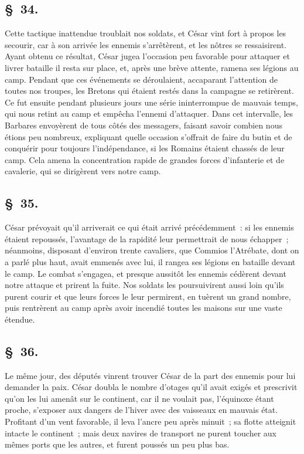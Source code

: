 \documentclass[french,twoside]{book} %
\begin{document}
\subsection[{§ 34.}]{ \textsc{§ 34.} }
\noindent Cette tactique inattendue troublait nos soldats, et César vint fort à propos les secourir, car à son arrivée les ennemis s’arrêtèrent, et les nôtres se ressaisirent. Ayant obtenu ce résultat, César jugea l’occasion peu favorable pour attaquer et livrer bataille il resta sur place, et, après une brève attente, ramena ses légions au camp. Pendant que ces événements se déroulaient, accaparant l’attention de toutes nos troupes, les Bretons qui étaient restés dans la campagne se retirèrent. Ce fut ensuite pendant plusieurs jours une série ininterrompue de mauvais temps, qui nous retint au camp et empêcha l’ennemi d’attaquer. Dans cet intervalle, les Barbares envoyèrent de tous côtés des messagers, faisant savoir combien nous étions peu nombreux, expliquant quelle occasion s’offrait de faire du butin et de conquérir pour toujours l’indépendance, si les Romains étaient chassés de leur camp. Cela amena la concentration rapide de grandes forces d’infanterie et de cavalerie, qui se dirigèrent vers notre camp.
\subsection[{§ 35.}]{ \textsc{§ 35.} }
\noindent César prévoyait qu’il arriverait ce qui était arrivé précédemment : si les ennemis étaient repoussés, l’avantage de la rapidité leur permettrait de nous échapper ; néanmoins, disposant d’environ trente cavaliers, que Commios l’Atrébate, dont on a parlé plus haut, avait emmenés avec lui, il rangea ses légions en bataille devant le camp. Le combat s’engagea, et presque aussitôt les ennemis cédèrent devant notre attaque et prirent la fuite. Nos soldats les poursuivirent aussi loin qu’ils purent courir et que leurs forces le leur permirent, en tuèrent un grand nombre, puis rentrèrent au camp après avoir incendié toutes les maisons sur une vaste étendue.
\subsection[{§ 36.}]{ \textsc{§ 36.} }
\noindent Le même jour, des députés vinrent trouver César de la part des ennemis pour lui demander la paix. César doubla le nombre d’otages qu’il avait exigés et prescrivit qu’on les lui amenât sur le continent, car il ne voulait pas, l’équinoxe étant proche, s’exposer aux dangers de l’hiver avec des vaisseaux en mauvais état. Profitant d’un vent favorable, il leva l’ancre peu après minuit ; sa flotte atteignit intacte le continent ; mais deux navires de transport ne purent toucher aux mêmes ports que les autres, et furent poussés un peu plus bas.
\end{document}
